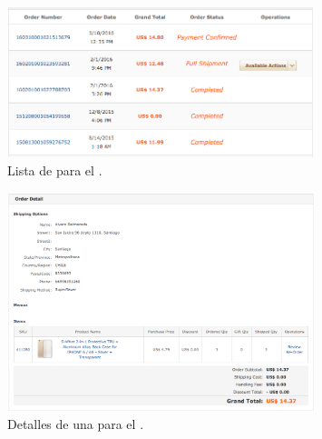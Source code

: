 
\begin{figure}[H]
	\centering
	\includegraphics[width=0.8\textwidth]{figuras/orders/examples/dx_list_orders.png}
	\caption{Lista de \ordersEF para el \websiteINT \dealextremeNAME.}
	\label{figure:apendice:orders:example:dx_list_orders}
\end{figure}

\begin{figure}[H]
	\centering
	\includegraphics[width=0.8\textwidth]{figuras/orders/examples/dx_order_detail.png}
	\caption{Detalles de una \ordersEF para el \websiteINT \dealextremeNAME.}
	\label{figure:apendice:orders:example:dx_order_detail}
\end{figure}
